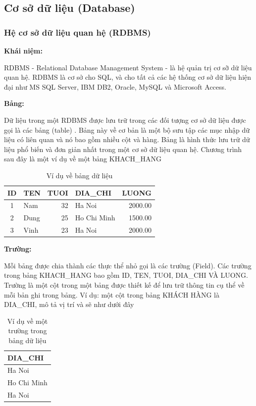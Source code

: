\subsection{Cơ sở dữ liệu (Database)}
\subsubsection{Hệ cơ sở dữ liệu quan hệ (RDBMS)}
\textbf{Khái niệm:}
\par
RDBMS - Relational Database Management System - là hệ quản trị cơ sỡ dữ liệu quan hệ. RDBMS là cơ sở cho SQL, và cho tất cả các hệ thống cơ sở dữ liệu hiện đại như MS SQL Server, IBM DB2, Oracle, MySQL và Microsoft Access.
\par
\textbf{Bảng:}
\par
Dữ liệu trong một RDBMS được lưu trữ trong các đối tượng cơ sở dữ liệu được gọi là các bảng (table) . Bảng này về cơ bản là một bộ sưu tập các mục nhập dữ liệu có liên quan và nó bao gồm nhiều cột và hàng.
Bảng là hình thức lưu trữ dữ liệu phổ biến và đơn giản nhất trong một cơ sở dữ liệu quan hệ. Chương trình sau đây là một ví dụ về một bảng KHACH\_HANG

\begin{table}[h]
    \centering
    \begin{tabular}{ |c|l|r|l|r| } 
    \hline
    ID & TEN & TUOI & DIA\_CHI & LUONG \\ 
    \hline
    1 & Nam & 32 & Ha Noi & 2000.00 \\
    \hline
    2 & Dung & 25 & Ho Chi Minh & 1500.00 \\
    \hline
    3 & Vinh & 23 & Ha Noi & 2000.00 \\
    \hline
    \end{tabular}
    \caption{Ví dụ về bảng dữ liệu}
    \label{tab:table_data}
\end{table}



\textbf{Trường:}
\par
Mỗi bảng được chia thành các thực thể nhỏ gọi là các trường (Field). Các trường trong bảng KHACH\_HANG bao gồm ID, TEN, TUOI, DIA\_CHI VÀ LUONG.
Trường là một cột trong một bảng được thiết kế để lưu trữ thông tin cụ thể về mỗi bản ghi trong bảng.
Ví dụ: một cột trong bảng KHÁCH HÀNG là DIA\_CHI, mô tả vị trí và sẽ như dưới đây

\begin{table}[h]
    \centering
    \begin{tabular}{ |l| } 
     \hline
     DIA\_CHI \\
     \hline
     Ha Noi \\
     \hline
     Ho Chi Minh \\
     \hline
     Ha Noi \\
     \hline
    \end{tabular}
    \caption{Ví dụ về một trường trong bảng dữ liệu}
    \label{tab:column_data}
\end{table}


